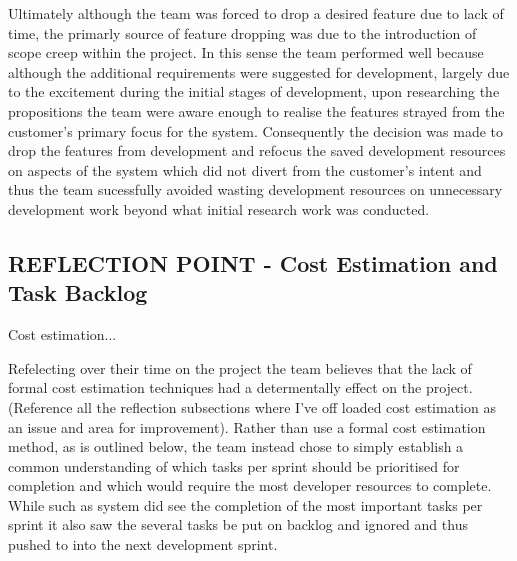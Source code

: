 \documentclass{l3proj}
\begin{document}
Ultimately although the team was forced to drop a desired feature due to lack of time, the primarly source of feature dropping was due to the introduction of scope creep within the project. In this sense the team performed well because although the additional requirements were suggested for development, largely due to the excitement during the initial stages of development, upon researching the propositions the team were aware enough to realise the features strayed from the customer's primary focus for the system. Consequently the decision was made to drop the features from development and refocus the saved development resources on aspects of the system which did not divert from the customer's intent and thus the team sucessfully avoided wasting development resources on unnecessary development work beyond what initial research work was conducted. 


\subsection{REFLECTION POINT - Cost Estimation and Task Backlog}
\label{sec:costreflection}

%

Cost estimation...

Refelecting over their time on the project the team believes that the lack of formal cost estimation techniques had a determentally effect on the project. (Reference all the reflection subsections where I've off loaded cost estimation as an issue and area for improvement). Rather than use a formal cost estimation method, as is outlined below, the team instead chose to simply establish a common understanding of which tasks per sprint should be prioritised for completion and which would require the most developer resources to complete. While such as system did see the completion of the most important tasks per sprint it also saw the several tasks be put on backlog and ignored and thus pushed to into the next development sprint. 
\end{document}
